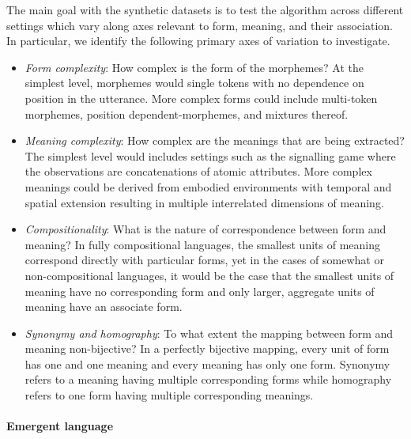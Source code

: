 The main goal with the synthetic datasets is to test the algorithm across different settings which vary along axes relevant to form, meaning, and their association.
In particular, we identify the following primary axes of variation to investigate.
\begin{itemize}
  \item \emph{Form complexity}:
    How complex is the form of the morphemes?
    At the simplest level, morphemes would single tokens with no dependence on position in the utterance.
    More complex forms could include multi-token morphemes, position dependent-morphemes, and mixtures thereof.
  \item \emph{Meaning complexity}:
    How complex are the meanings that are being extracted?
    The simplest level would includes settings such as the signalling game where the observations are concatenations of atomic attributes.
    More complex meanings could be derived from embodied environments with temporal and spatial extension resulting in multiple interrelated dimensions of meaning.
  \item \emph{Compositionality}:
    What is the nature of correspondence between form and meaning?
    In fully compositional languages, the smallest units of meaning correspond directly with particular forms, yet in the cases of somewhat or non-compositional languages, it would be the case that the smallest units of meaning have no corresponding form and only larger, aggregate units of meaning have an associate form.
  \item \emph{Synonymy and homography}:
    To what extent the mapping between form and meaning non-bijective?
    In a perfectly bijective mapping, every unit of form has one and one meaning and every meaning has only one form.
    Synonymy refers to a meaning having multiple corresponding forms while homography refers to one form having multiple corresponding meanings.
\end{itemize}

\paragraph{Emergent language}

